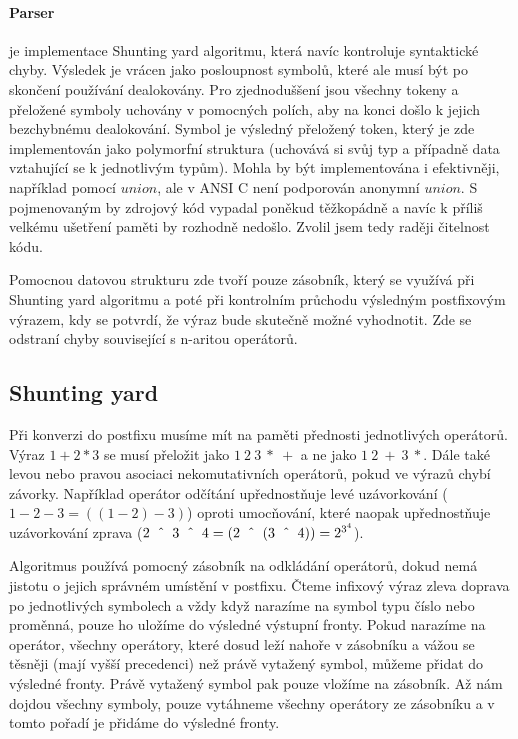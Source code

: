 \documentclass[11pt]{article}
\newcommand\CARET{\mathbin{\char`\^}}
\begin{document}
\paragraph{Parser}
je implementace Shunting yard algoritmu, která navíc kontroluje syntaktické
chyby. Výsledek je vrácen jako posloupnost symbolů, které ale musí být po
skončení používání dealokovány. Pro zjednoduššení jsou všechny tokeny a
přeložené symboly uchovány v pomocných polích, aby na konci došlo k jejich
bezchybnému dealokování. Symbol je výsledný přeložený token, který je zde
implementován jako polymorfní struktura (uchovává si svůj typ a případně data
vztahující se k jednotlivým typům). Mohla by být implementována i efektivněji,
například pomocí $union$, ale v ANSI C není podporován anonymní $union$. S
pojmenovaným by zdrojový kód vypadal poněkud těžkopádně a navíc k příliš
velkému ušetření paměti by rozhodně nedošlo. Zvolil jsem tedy raději čitelnost
kódu. 

Pomocnou datovou strukturu zde tvoří pouze zásobník, který se využívá při
Shunting yard algoritmu a poté při kontrolním průchodu výsledným postfixovým
výrazem, kdy se potvrdí, že výraz bude skutečně možné vyhodnotit. Zde se
odstraní chyby související s n-aritou operátorů.

\subsection{Shunting yard}
Při konverzi do postfixu musíme mít na paměti přednosti jednotlivých operátorů.
Výraz $1 + 2 * 3$ se musí přeložit jako $1~2~3~*~+$ a ne jako $1~2~+~3~*$.
Dále také levou nebo pravou asociaci nekomutativních operátorů, pokud ve výrazů
chybí závorky.  Například operátor odčítání upřednostňuje levé uzávorkování ($1
- 2 - 3 = ((1 - 2) - 3)$) oproti umocňování, které naopak upřednostňuje
uzávorkování zprava ($2~\CARET~3~\CARET~4 = (2~\CARET~(3~\CARET~4)) =
2^{3^4}$).

Algoritmus používá pomocný zásobník na odkládání operátorů, dokud nemá jistotu
o jejich správném umístění v postfixu. Čteme infixový výraz zleva doprava po
jednotlivých symbolech a vždy když narazíme na symbol typu číslo nebo proměnná,
pouze ho uložíme do výsledné výstupní fronty. Pokud narazíme na operátor,
všechny operátory, které dosud leží nahoře v zásobníku a vážou se těsněji (mají
vyšší precedenci) než právě vytažený symbol, můžeme přidat do výsledné fronty.
Právě vytažený symbol pak pouze vložíme na zásobník. Až nám dojdou všechny
symboly, pouze vytáhneme všechny operátory ze zásobníku a v tomto pořadí je
přidáme do výsledné fronty. \\
\end{document}
